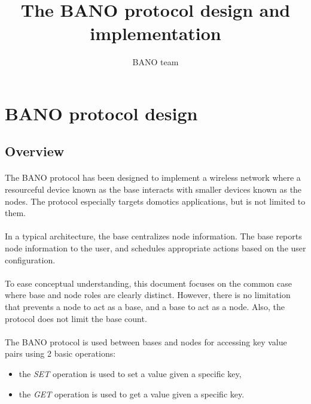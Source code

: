 \documentclass[a4paper, 11pt]{article}
\begin{document}
\title{The BANO protocol design and implementation}
\author{BANO team}
\date{}

\maketitle



\clearpage
\section{BANO protocol design}

\subsection{Overview}
\paragraph{}
The BANO protocol has been designed to implement a wireless network where a
resourceful device known as the base interacts with smaller devices known as
the nodes. The protocol especially targets domotics applications, but is not
limited to them.

\paragraph{}
In a typical architecture, the base centralizes node information. The base
reports node information to the user, and schedules appropriate actions based
on the user configuration.

\paragraph{}
To ease conceptual understanding, this document focuses on the common case where
base and node roles are clearly distinct. However, there is no limitation that
prevents a node to act as a base, and a base to act as a node. Also, the protocol
does not limit the base count.

\paragraph{}
The BANO protocol is used between bases and nodes for accessing key value pairs
using 2 basic operations:
\begin{itemize}
\item the \textit{SET} operation is used to set a value given a specific key,
\item the \textit{GET} operation is used to get a value given a specific key.
\end{itemize}
\end{document}
